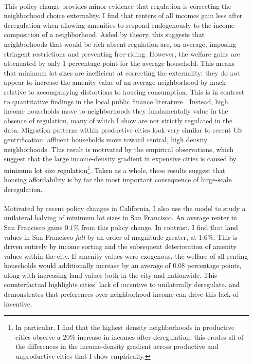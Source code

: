 \documentclass[12pt]{article}
\begin{document}
	\paragraph*{}  This policy change provides minor evidence that regulation is correcting the neighborhood choice externality. I find that renters of all incomes gain less after deregulation when allowing amenities to respond endogenously to the income composition of a neighborhood. Aided by theory, this suggests that neighborhoods that would be rich absent regulation are, on average, imposing stringent restrictions and preventing free-riding. However, the welfare gains are attenuated by only $1$ percentage point for the average household. This means that minimum lot sizes are inefficient at correcting the externality: they do not appear to increase the amenity value of an average neighborhood by much relative to accompanying distortions to housing consumption. This is in contrast to quantitative findings in the local public finance literature \citep{calabresetal}. Instead, high income households move to neighborhoods they fundamentally value in the absence of regulation, many of which I show are not strictly regulated in the data. Migration patterns within productive cities look very similar to recent US gentrification: affluent households move toward central, high density neighborhoods. This result is motivated by the empirical observations, which suggest that the large income-density gradient in expensive cities is caused by minimum lot size regulation\footnote{In particular, I find that the highest density neighborhoods in productive cities observe a $20 \%$ increase in incomes after deregulation; this erodes all of the differences in the income-density gradient across productive and unproductive cities that I show empirically.}. Taken as a whole, these results suggest that housing affordability is by far the most important consequence of large-scale deregulation. 
	
	\paragraph*{}
	Motivated by recent policy changes in California, I also use the model to study a unilateral halving of minimum lot sizes in San Francisco. An average renter in San Francisco gains $0.1 \%$ from this policy change. In contrast, I find that land values in San Francisco \textit{fall} by an order of magnitude greater, at $1.6\%$. This is driven entirely by income sorting and the subsequent deterioration of amenity values within the city. If amenity values were exogenous, the welfare of all renting households would additionally increase by an average of $0.08$ percentage points, along with increasing land values both in the city and nationwide. This counterfactual highlights cities' lack of incentive to unilaterally deregulate, and demonstrates that preferences over neighborhood income can drive this lack of incentive. 
	
\end{document}
